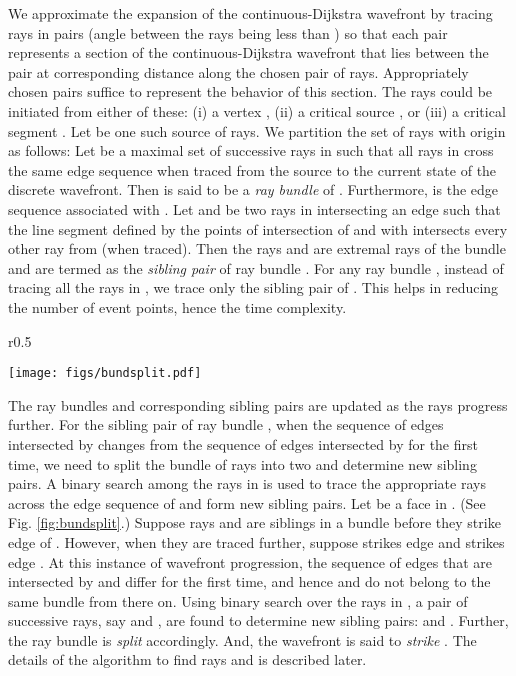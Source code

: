 \documentclass[11pt]{article}
\begin{document}
We approximate the expansion of the continuous-Dijkstra wavefront by tracing rays in pairs (angle between the rays being less than ) so that each pair represents a section of the continuous-Dijkstra wavefront
that lies between the pair at corresponding distance  along the chosen pair of rays.
Appropriately chosen  pairs suffice to represent the behavior of this section.
The rays could be initiated from either of these: (i) a vertex , (ii) a critical source , or (iii) a critical segment .
Let  be one such source of rays.
We partition the set of rays with origin  as follows: 
Let  be a maximal set of successive rays in  such that all rays in  cross the same edge sequence  when traced from the source to  the current state of the discrete wavefront.
Then  is said to be a {\it ray bundle} of .
Furthermore,  is the edge sequence associated with .
Let  and  be two rays in  intersecting an edge  such that the line segment defined by the points of intersection of  and  with  intersects every other ray from  (when traced).
Then the rays  and  are extremal rays of the bundle and are termed as the {\it sibling pair} of ray bundle .
For any ray bundle , instead of tracing all the rays in , we trace only the sibling pair of .
This helps in reducing the number of event points, hence the time complexity.

\begin{wrapfigure}{r}{0.5\textwidth}
\begin{minipage}[t]{\linewidth}
\vspace{-20pt}
\hspace{-10pt}
\begin{center}
\texttt{[image: figs/bundsplit.pdf]}
\end{center}
\vspace{-20pt}
\caption{\footnotesize Split of a ray bundle }
\label{fig:bundsplit}
\vspace{-10pt}
\end{minipage}
\end{wrapfigure}

The ray bundles and corresponding sibling pairs are updated as the rays progress further.
For the sibling pair  of ray bundle , when the sequence of edges intersected by  changes from the sequence of edges intersected by  for the first time, we need to split the bundle of rays into two and determine new sibling pairs.  
A binary search among the rays in  is used to trace the appropriate rays across the edge sequence of  and form new sibling pairs. 
Let  be a face  in .
(See Fig. \ref{fig:bundsplit}.)
Suppose rays  and  are siblings in a bundle  before they strike edge  of . 
However, when they are traced further, suppose  strikes edge  and  strikes edge .
At this instance of wavefront progression, the sequence of edges that are intersected by   and  differ for the first time, and hence  and  do not belong to the same bundle from there on.
Using binary search over the rays in , a pair of successive rays, say  and , are found to determine new sibling pairs:  and .
Further, the ray bundle  is {\it split} accordingly.
And, the wavefront is said to {\em strike} . 
The details of the algorithm to find rays  and  is described later.
\end{document}

